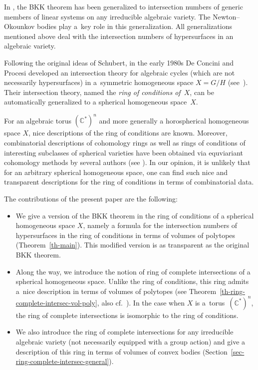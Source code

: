 \documentclass[10pt,a4paper]{amsart}
\def \C{\mathbb{C}}
\numberwithin{equation}{section}
\theoremstyle{definition}
\begin{document}
In \cite{KKh-Annals, LM}, the BKK theorem has been generalized to intersection numbers of generic members of linear systems on any irreducible algebraic variety. The Newton--Okounkov bodies play a~key role in this generalization. All generalizations mentioned above deal with the intersection numbers of hypersurfaces in an algebraic variety.

Following the original ideas of Schubert, in the early 1980s De Concini and Procesi deve\-lo\-ped an intersection theory for algebraic cycles (which are not necessarily hypersurfaces) in a~symmetric homogeneous space $X = G/H$ (see~\cite{DP}). Their intersection theory, named the {\it ring of conditions of~$X$}, can be automatically generalized to a spherical homogeneous space~$X$.

For an algebraic torus $(\C^*)^n$ and more generally a horospherical homogeneous space $X$, nice descriptions of the ring of conditions are known. Moreover, combinatorial descriptions of cohomology rings as well as rings of conditions of interesting subclasses of spherical varieties have been obtained via equviariant cohomology methods by several authors (see \cite{Bifet-DeConcini-Procesi,Littelmann-Procesi, Strickland}). In our opinion, it is unlikely that for an arbitrary spherical homogeneous space, one can find such nice and transparent descriptions for the ring of conditions in terms of combinatorial data.

The contributions of the present paper are the following:
\begin{itemize}\itemsep=0pt
\item[(1)] We give a version of the BKK theorem in the ring of conditions of a spherical homogeneous space $X$, namely a formula for the intersection numbers of hypersurfaces in the ring of conditions in terms of volumes of polytopes (Theorem~\ref{th-main}). This modified version is as transparent as the original BKK theorem.
\item[(2)] Along the way, we introduce the notion of ring of complete intersections of a spherical homogeneous space. Unlike the ring of conditions, this ring admits a~nice description in terms of volumes of polytopes (see Theorem~\ref{th-ring-complete-intersec-vol-poly}, also cf.~\cite{Kaveh-note}). In the case when $X$ is a~torus~$(\C^*)^n$, the ring of complete intersections is isomorphic to the ring of conditions.
\item[(3)] We also introduce the ring of complete intersections for any irreducible algebraic variety (not necessarily equipped with a group action) and give a description of this ring in terms of volumes of convex bodies (Section~\ref{sec-ring-complete-intersec-general}).
\end{itemize}
\end{document}

